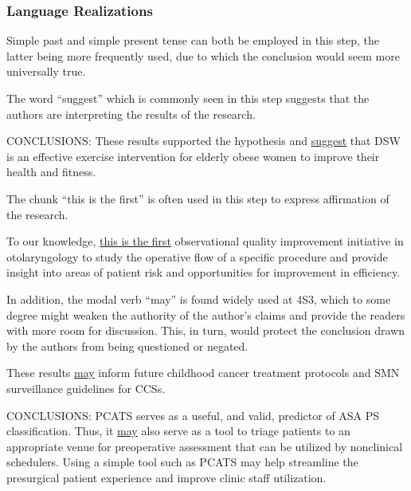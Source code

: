 \documentclass[a4paper]{ctexbook}
\begin{document}
    \subsubsection{Language Realizations}

    Simple past and simple present tense can both be employed in this step, the latter being more frequently used, due to which the conclusion would seem more universally true.
    
    The word ``suggest'' which is commonly seen in this step suggests that the authors are interpreting the results of the research.

    \begin{eg}{}
      CONCLUSIONS: These results supported the hypothesis and \uline{suggest} that DSW is an effective exercise intervention for elderly obese women to improve their health and fitness.
    \end{eg}
    
    The chunk ``this is the first'' is often used in this step to express affirmation of the research.

    \begin{eg}{}
      To our knowledge, \uline{this is the first} observational quality improvement initiative in otolaryngology to study the operative flow of a specific procedure and provide insight into areas of patient risk and opportunities for improvement in efficiency.  
    \end{eg}
    
    In addition, the modal verb ``may'' is found widely used at 4S3, which to some degree might weaken the authority of the author's claims and provide the readers with more room for discussion. This, in turn, would protect the conclusion drawn by the authors from being questioned or negated.

    \begin{eg}{}
      These results \uline{may} inform future childhood cancer treatment protocols and SMN surveillance guidelines for CCSs.
    \end{eg}

    \begin{eg}{}
      CONCLUSIONS: PCATS serves as a useful, and valid, predictor of ASA PS classification. Thus, it \uline{may} also serve as a tool to triage patients to an appropriate venue for preoperative assessment that can be utilized by nonclinical schedulers. Using a simple tool such as PCATS may help streamline the presurgical patient experience and improve clinic staff utilization.
    \end{eg}
\end{document}
